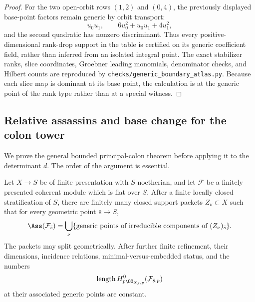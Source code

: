 \begin{proof}
For the two open-orbit rows \((1,2)\) and \((0,4)\), the previously
displayed base-point factors remain generic by orbit transport:
\[
 u_0u_1,\qquad 6u_0^2+u_0u_1+4u_1^2,
\]
and the second quadratic has nonzero discriminant.  Thus every
positive-dimensional rank-drop support in the table is certified on
its generic coefficient field, rather than inferred from an isolated
integral point.
The exact stabilizer ranks, slice coordinates, Groebner leading
monomials, denominator checks, and Hilbert counts are reproduced by
\texttt{checks/generic\_boundary\_atlas.py}.  Because each slice
map is dominant at its base point, the calculation is at the generic
point of the rank type rather than at a special witness.
\end{proof}

\subsection{Relative assassins and base change for the colon tower}

We prove the general bounded principal-colon theorem before applying it
to the determinant \(d\).  The order of the argument is essential.

\begin{lemma}
\label{lem:finite-geometric-assassin-stratification}
Let \(X\to S\) be of finite presentation with \(S\) noetherian, and
let \(\mathcal F\) be a finitely presented coherent module which is
flat over \(S\).  After a finite locally closed stratification of
\(S\), there are finitely many closed support packets
\(Z_\nu\subset X\) such that for every geometric point
\(\bar s\to S\),
\[
 \Ass(\mathcal F_{\bar s})
 =
 \bigcup_\nu
 \{\text{generic points of irreducible components of }(Z_\nu)_{\bar s}\}.
\]
The packets may split geometrically.  After further finite refinement,
their dimensions, incidence relations, minimal-versus-embedded status,
and the numbers
\[
 \operatorname{length} H^0_{p\OO_{X_{\bar s},p}}(\mathcal F_{\bar s,p})
\]
at their associated generic points are constant.
\end{lemma}

